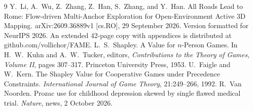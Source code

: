 \documentclass[11pt]{article}
\theoremstyle{plain}
\theoremstyle{remark}
\begin{document}
\begin{thebibliography}{9}
 Y.~Li, A.~Wu, Z.~Zhang, Z.~Han, S.~Zhang, and Y.~Han. All Roads Lead to Rome: Flow-driven Multi-Anchor Exploration for Open-Environment Active 3D Mapping. arXiv:2609.36889v1 [cs.RO], 29 September 2026. Version formatted for NeurIPS 2026. An extended 42-page copy with appendices is distributed at github.com/vollichor/FAME.
 L.~S.~Shapley. A Value for $n$-Person Games. In H.~W.~Kuhn and A.~W.~Tucker, editors, \emph{Contributions to the Theory of Games, Volume II}, pages 307--317. Princeton University Press, 1953.
 U.~Faigle and W.~Kern. The Shapley Value for Cooperative Games under Precedence Constraints. \emph{International Journal of Game Theory}, 21:249--266, 1992.
 R.~Van Noorden. Prozac use for childhood depression skewed by single flawed medical trial. \emph{Nature}, news, 2 October 2026.
\end{thebibliography}
\end{document}
